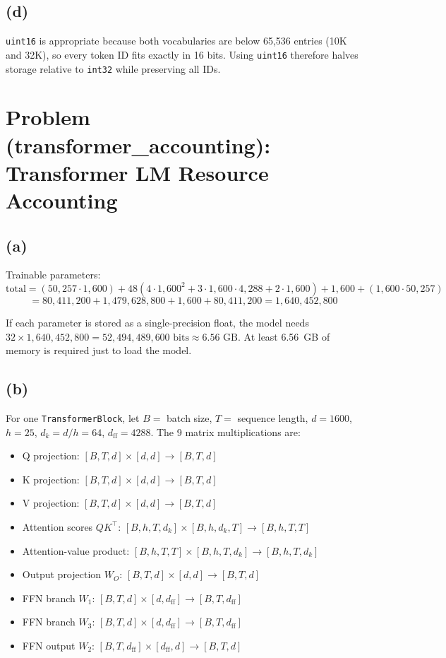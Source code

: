 \documentclass[11pt]{article}
\begin{document}
\subsection*{(d)}
\texttt{uint16} is appropriate because both vocabularies are below 65,536 entries (10K and 32K), so every token ID fits exactly in 16 bits. Using \texttt{uint16} therefore halves storage relative to \texttt{int32} while preserving all IDs.

\section{Problem (transformer\_accounting): Transformer LM Resource Accounting}
\subsection*{(a)}
Trainable parameters:
\[
\text{total}
= (50{,}257\cdot1{,}600)
+ 48\left(4\cdot1{,}600^2 + 3\cdot1{,}600\cdot4{,}288 + 2\cdot1{,}600\right)
+ 1{,}600
+ (1{,}600\cdot50{,}257)
\]
\[
= 80{,}411{,}200 + 1{,}479{,}628{,}800 + 1{,}600 + 80{,}411{,}200
= 1{,}640{,}452{,}800
\]

If each parameter is stored as a single-precision float, the model needs $32 \times 1{,}640{,}452{,}800 = 52{,}494{,}489{,}600\text{ bits} \approx 6.56\text{ GB}$. At least 6.56~GB of memory is required just to load the model.

\subsection*{(b)}
For one \texttt{TransformerBlock}, let \(B=\) batch size, \(T=\) sequence length, \(d=1600\), \(h=25\), \(d_k=d/h=64\), \(d_{\text{ff}}=4288\). The 9 matrix multiplications are:
\begin{itemize}
    \item Q projection: \([B,T,d]\times[d,d]\to[B,T,d]\)
    \item K projection: \([B,T,d]\times[d,d]\to[B,T,d]\)
    \item V projection: \([B,T,d]\times[d,d]\to[B,T,d]\)
    \item Attention scores \(QK^\top\): \([B,h,T,d_k]\times[B,h,d_k,T]\to[B,h,T,T]\)
    \item Attention-value product: \([B,h,T,T]\times[B,h,T,d_k]\to[B,h,T,d_k]\)
    \item Output projection \(W_O\): \([B,T,d]\times[d,d]\to[B,T,d]\)
    \item FFN branch \(W_1\): \([B,T,d]\times[d,d_{\text{ff}}]\to[B,T,d_{\text{ff}}]\)
    \item FFN branch \(W_3\): \([B,T,d]\times[d,d_{\text{ff}}]\to[B,T,d_{\text{ff}}]\)
    \item FFN output \(W_2\): \([B,T,d_{\text{ff}}]\times[d_{\text{ff}},d]\to[B,T,d]\)
\end{itemize}
\end{document}
